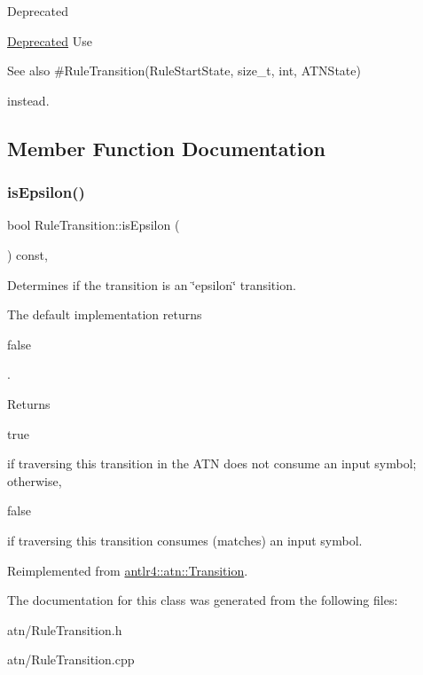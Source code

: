 \begin{DoxyRefDesc}{Deprecated}
\item[\hyperlink{deprecated__deprecated000006}{Deprecated}]Use \begin{DoxySeeAlso}{See also}
\#\+Rule\+Transition(\+Rule\+Start\+State, size\+\_\+t, int, A\+T\+N\+State)


\end{DoxySeeAlso}
instead. \end{DoxyRefDesc}


\subsection{Member Function Documentation}
\mbox{\label{classantlr4_1_1atn_1_1RuleTransition_a899ddb9161a918c929cd90371aeec15b}} 
\subsubsection{\texorpdfstring{is\+Epsilon()}{isEpsilon()}}
{\footnotesize\ttfamily bool Rule\+Transition\+::is\+Epsilon (\begin{DoxyParamCaption}{ }\end{DoxyParamCaption}) const\hspace{0.3cm}{\ttfamily [override]}, {\ttfamily [virtual]}}

Determines if the transition is an \char`\"{}epsilon\char`\"{} transition.

The default implementation returns
\begin{DoxyCode}
\textcolor{keyword}{false} 
\end{DoxyCode}
 .

\begin{DoxyReturn}{Returns}

\begin{DoxyCode}
\textcolor{keyword}{true} 
\end{DoxyCode}
 if traversing this transition in the A\+TN does not consume an input symbol; otherwise,
\begin{DoxyCode}
\textcolor{keyword}{false} 
\end{DoxyCode}
 if traversing this transition consumes (matches) an input symbol. 
\end{DoxyReturn}


Reimplemented from \hyperlink{classantlr4_1_1atn_1_1Transition_a8e712c7a46586d73c054c56f481b1be7}{antlr4\+::atn\+::\+Transition}.



The documentation for this class was generated from the following files\+:\begin{DoxyCompactItemize}
\item 
atn/Rule\+Transition.\+h\item 
atn/Rule\+Transition.\+cpp\end{DoxyCompactItemize}
